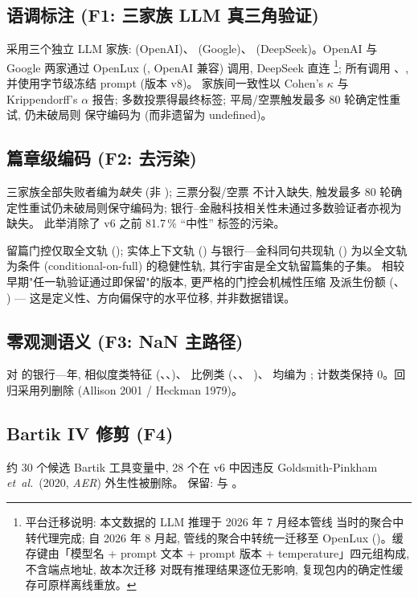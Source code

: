 \subsection{语调标注 (F1: 三家族 LLM 真三角验证)}
采用三个独立 LLM 家族:  (OpenAI)、
 (Google)、
(DeepSeek)。OpenAI 与 Google 两家通过 OpenLux
(, OpenAI 兼容) 调用, DeepSeek 直连
\footnote{平台迁移说明: 本文数据的 LLM 推理于 2026 年 7 月经本管线
当时的聚合中转代理完成; 自 2026 年 8 月起, 管线的聚合中转统一迁移至
OpenLux ()。缓存键由「模型名 + prompt
文本 + prompt 版本 + temperature」四元组构成, 不含端点地址, 故本次迁移
对既有推理结果逐位无影响, 复现包内的确定性缓存可原样离线重放。}; 所有调用 、,
并使用字节级冻结 prompt (版本 v8)。
家族间一致性以 Cohen's $\kappa$ 与 Krippendorff's $\alpha$ 报告;
多数投票得最终标签; 平局/空票触发最多 80 轮确定性重试, 仍未破局则
保守编码为 (而非遗留为 undefined)。

\subsection{篇章级编码 (F2: 去污染)}
三家族全部失败者编为\emph{缺失} (非 ); 三票分裂/空票
不计入缺失, 触发最多 80 轮确定性重试仍未破局则保守编码为;
银行--金融科技相关性未通过多数验证者亦视为缺失。
此举消除了 v6 之前 81.7\,\% ``中性'' 标签的污染。

留篇门控仅取全文轨 (); 实体上下文轨
() 与银行—金科同句共现轨 () 为以全文轨为条件
(conditional-on-full) 的稳健性轨, 其行宇宙是全文轨留篇集的子集。
相较早期"任一轨验证通过即保留"的版本, 更严格的门控会机械性压缩
 及派生份额 (、
) --- 这是定义性、方向偏保守的水平位移,
并非数据错误。

\subsection{零观测语义 (F3: NaN 主路径)}
对  的银行—年, 相似度类特征
(、、)、
比例类 (、、
)、 均编为
; 计数类保持 0。回归采用列删除 (Allison 2001 / Heckman 1979)。

\subsection{Bartik IV 修剪 (F4)}
约 30 个候选 Bartik 工具变量中, 28 个在 v6 中因违反
Goldsmith-Pinkham \emph{et~al.}\ (2020, \emph{AER}) 外生性被删除。
保留:  与 。

